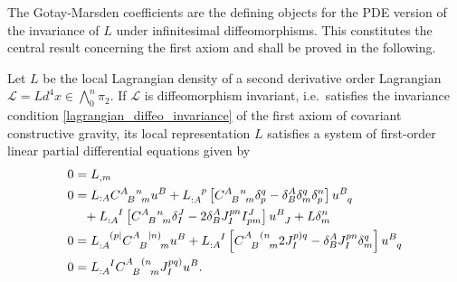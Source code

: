 The Gotay-Marsden coefficients are the defining objects for the PDE version of the invariance of $L$ under infinitesimal diffeomorphisms. This constitutes the central result concerning the first axiom and shall be proved in the following.

\begin{theorem}\label{equivariance_eqns_thm}
  Let $L$ be the local Lagrangian density of a second derivative order Lagrangian $\mathscr L = Ld^4x \in \textstyle\bigwedge_0^n\pi_2$. If $\mathscr L$ is diffeomorphism invariant, i.e.~satisfies the invariance condition \eqref{lagrangian_diffeo_invariance} of the first axiom of covariant constructive gravity, its local representation $L$ satisfies a system of first-order linear partial differential equations given by
  \begin{subequations}\label{equivariance_eqns}
    \begin{align}
      0 &{} = L_{,m} \label{equivariance_eqn_1}\\
      0 &{} = L_{:A} \gmc{A}{B}{n}{m}u^B + L_{:A}^{\hphantom{:A}p}\left\lbrack\gmc{A}{B}{n}{m} \delta^q_p - \delta^A_B\delta^q_m\delta^n_p\right\rbrack u^{B}_{\hphantom Bq} \nonumber \\
        &{} \hphantom{=} + L_{:A}^{\hphantom{:A}I} \left\lbrack\gmc{A}{B}{n}{m} \delta^J_I - 2 \delta^A_B J^{pn}_{I} I^J_{pm}\right\rbrack u^B_{\hphantom BJ} + L\delta^n_m \label{equivariance_eqn_2}\\
      0 &{} = L_{:A}^{\hphantom{:A}(p\mid} \gmc{A}{B}{\mid n)}{m} u^B + L_{:A}^{\hphantom{:A}I}\left\lbrack\gmc{A}{B}{(n}{m} 2J^{p)q}_I - \delta^A_B J^{pn}_I \delta^q_m\right\rbrack u^B_{\hphantom Bq} \label{equivariance_eqn_3}\\
      0 &{} = L_{:A}^{\hphantom{:A}I} \gmc{A}{B}{(n}{m} J^{pq)}_I u^B.\label{equivariance_eqn_4}
    \end{align}
  \end{subequations}
\end{theorem}
